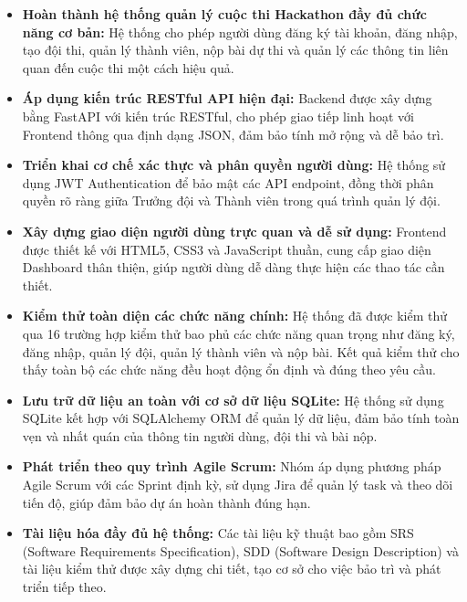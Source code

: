 \documentclass[12pt,a4paper]{report}
\begin{document}
\begin{itemize}
	\item \textbf{Hoàn thành hệ thống quản lý cuộc thi Hackathon đầy đủ chức năng cơ bản:} Hệ thống cho phép người dùng đăng ký tài khoản, đăng nhập, tạo đội thi, quản lý thành viên, nộp bài dự thi và quản lý các thông tin liên quan đến cuộc thi một cách hiệu quả.
	
	\item \textbf{Áp dụng kiến trúc RESTful API hiện đại:} Backend được xây dựng bằng FastAPI với kiến trúc RESTful, cho phép giao tiếp linh hoạt với Frontend thông qua định dạng JSON, đảm bảo tính mở rộng và dễ bảo trì.
	
	\item \textbf{Triển khai cơ chế xác thực và phân quyền người dùng:} Hệ thống sử dụng JWT Authentication để bảo mật các API endpoint, đồng thời phân quyền rõ ràng giữa Trưởng đội và Thành viên trong quá trình quản lý đội.
	
	\item \textbf{Xây dựng giao diện người dùng trực quan và dễ sử dụng:} Frontend được thiết kế với HTML5, CSS3 và JavaScript thuần, cung cấp giao diện Dashboard thân thiện, giúp người dùng dễ dàng thực hiện các thao tác cần thiết.
	
	\item \textbf{Kiểm thử toàn diện các chức năng chính:} Hệ thống đã được kiểm thử qua 16 trường hợp kiểm thử bao phủ các chức năng quan trọng như đăng ký, đăng nhập, quản lý đội, quản lý thành viên và nộp bài. Kết quả kiểm thử cho thấy toàn bộ các chức năng đều hoạt động ổn định và đúng theo yêu cầu.
	
	\item \textbf{Lưu trữ dữ liệu an toàn với cơ sở dữ liệu SQLite:} Hệ thống sử dụng SQLite kết hợp với SQLAlchemy ORM để quản lý dữ liệu, đảm bảo tính toàn vẹn và nhất quán của thông tin người dùng, đội thi và bài nộp.
	
	\item \textbf{Phát triển theo quy trình Agile Scrum:} Nhóm áp dụng phương pháp Agile Scrum với các Sprint định kỳ, sử dụng Jira để quản lý task và theo dõi tiến độ, giúp đảm bảo dự án hoàn thành đúng hạn.
	
	\item \textbf{Tài liệu hóa đầy đủ hệ thống:} Các tài liệu kỹ thuật bao gồm SRS (Software Requirements Specification), SDD (Software Design Description) và tài liệu kiểm thử được xây dựng chi tiết, tạo cơ sở cho việc bảo trì và phát triển tiếp theo.
\end{itemize}
\end{document}

